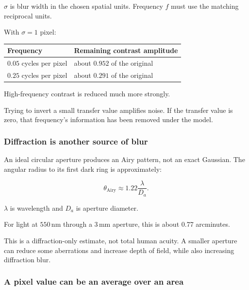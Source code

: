 \(\sigma\) is blur width in the chosen spatial units. Frequency \(f\) must use the matching reciprocal units.

With \(\sigma=1\) pixel:

{\def\LTcaptype{none} %
\begin{longtable}[]{@{}ll@{}}
\toprule\noalign{}
Frequency & Remaining contrast amplitude \\
\midrule\noalign{}
\endhead
\bottomrule\noalign{}
\endlastfoot
\(0.05\) cycles per pixel & about \(0.952\) of the original \\
\(0.25\) cycles per pixel & about \(0.291\) of the original \\
\end{longtable}
}

High-frequency contrast is reduced much more strongly.

Trying to invert a small transfer value amplifies noise. If the transfer value is zero, that frequency's information has been removed under the model.

\subsubsection{Diffraction is another source of blur}\label{04-visual-computing-ii-ch043-diffraction-is-another-source-of-blur}

\hypertarget{04-visual-computing-ii-ch043-diffraction-is-another-source-of-blur}{}

An ideal circular aperture produces an Airy pattern, not an exact Gaussian. The angular radius to its first dark ring is approximately:

\[
\theta_{\mathrm{Airy}}\approx1.22\frac{\lambda}{D_a}.
\]

\(\lambda\) is wavelength and \(D_a\) is aperture diameter.

For light at \(550\,\mathrm{nm}\) through a \(3\,\mathrm{mm}\) aperture, this is about 0.77 arcminutes.

This is a diffraction-only estimate, not total human acuity. A smaller aperture can reduce some aberrations and increase depth of field, while also increasing diffraction blur.

\subsubsection{A pixel value can be an average over an area}\label{04-visual-computing-ii-ch043-a-pixel-value-can-be-an-average-over-an-area}


